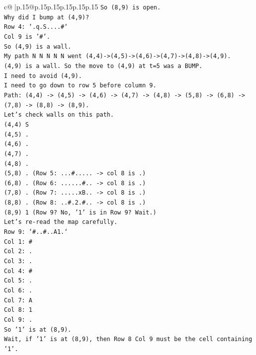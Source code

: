 \documentclass{article}
\begin{document}
{\begin{supertabular}{c@{$\;$}|p{.15\linewidth}@{}p{.15\linewidth}p{.15\linewidth}p{.15\linewidth}p{.15\linewidth}p{.15\linewidth}}
{{{\texttt{So (8,9) is open.} \\
\texttt{Why did I bump at (4,9)?} \\
\texttt{Row 4: `.q.S....\#`} \\
\texttt{Col 9 is '\#'.} \\
\texttt{So (4,9) is a wall.} \\
\texttt{My path N N N N N went (4,4){-}>(4,5){-}>(4,6){-}>(4,7){-}>(4,8){-}>(4,9).} \\
\texttt{(4,9) is a wall. So the move to (4,9) at t=5 was a BUMP.} \\
\texttt{I need to avoid (4,9).} \\
\texttt{I need to go down to row 5 before column 9.} \\
\texttt{Path: (4,4) {-}> (4,5) {-}> (4,6) {-}> (4,7) {-}> (4,8) {-}> (5,8) {-}> (6,8) {-}> (7,8) {-}> (8,8) {-}> (8,9).} \\
\texttt{Let's check walls on this path.} \\
\texttt{(4,4) S} \\
\texttt{(4,5) .} \\
\texttt{(4,6) .} \\
\texttt{(4,7) .} \\
\texttt{(4,8) .} \\
\texttt{(5,8) . (Row 5: ...\#..... {-}> col 8 is .)} \\
\texttt{(6,8) . (Row 6: ......\#.. {-}> col 8 is .)} \\
\texttt{(7,8) . (Row 7: .....xB.. {-}> col 8 is .)} \\
\texttt{(8,8) . (Row 8: ..\#.2.\#.. {-}> col 8 is .)} \\
\texttt{(8,9) 1 (Row 9? No, '1' is in Row 9? Wait.)} \\
\texttt{Let's re{-}read the map carefully.} \\
\texttt{Row 9: `\#..\#..A1.`} \\
\texttt{Col 1: \#} \\
\texttt{Col 2: .} \\
\texttt{Col 3: .} \\
\texttt{Col 4: \#} \\
\texttt{Col 5: .} \\
\texttt{Col 6: .} \\
\texttt{Col 7: A} \\
\texttt{Col 8: 1} \\
\texttt{Col 9: .} \\
\texttt{So '1' is at (8,9).} \\
\texttt{Wait, if '1' is at (8,9), then Row 8 Col 9 must be the cell containing '1'.} \\
}}}
\end{supertabular}}
\end{document}
